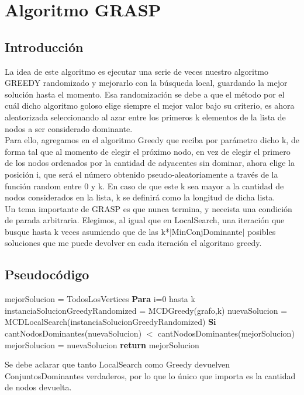 \section{Algoritmo GRASP}

\subsection{Introducción}
La idea de este algoritmo es ejecutar una serie de veces nuestro algoritmo GREEDY randomizado y mejorarlo con la búsqueda local, guardando la mejor solución hasta el momento.
Esa randomización se debe a que el método por el cuál dicho algoritmo goloso elige siempre el mejor valor bajo su criterio, es ahora aleatorizada seleccionando al azar entre los primeros k elementos de la
lista de nodos a ser considerado dominante.\\
Para ello, agregamos en el algoritmo Greedy que reciba por parámetro dicho k, de forma tal que al momento de elegir el próximo nodo, en vez de elegir el primero de los nodos ordenados por la cantidad de adyacentes
sin dominar, ahora elige la posición i, que será el número obtenido pseudo-aleatoriamente a través de la función random entre 0 y k. En caso de que este k sea mayor a la cantidad de nodos considerados en la lista, 
k se definirá como la longitud de dicha lista.\\
Un tema importante de GRASP es que nunca termina, y neceista una condición de parada arbitraria. Elegimos, al igual que en LocalSearch, una iteración que busque hasta k veces asumiendo que
de las k*$|$MinConjDominante$|$ posibles soluciones que me puede devolver en cada iteración el algoritmo greedy.

\subsection{Pseudocódigo}

\begin{codebox}
\li	mejorSolucion = TodosLosVertices
\li \textbf{Para} i=0 hasta k \Do
\li 	instanciaSolucionGreedyRandomized = MCDGreedy(grafo,k)
\li	nuevaSolucion = MCDLocalSearch(instanciaSolucionGreedyRandomized)
\li 	\textbf{Si} cantNodosDominantes(nuevaSolucion) $<$ cantNodosDominantes(mejorSolucion)  \Do
\li		mejorSolucion = nuevaSolucion
	\End
    \End	
\li	\textbf{return} mejorSolucion	
\end{codebox}
Se debe aclarar que tanto LocalSearch como Greedy devuelven ConjuntosDominantes verdaderos, por lo que lo único que importa es la cantidad de nodos devuelta.\\

